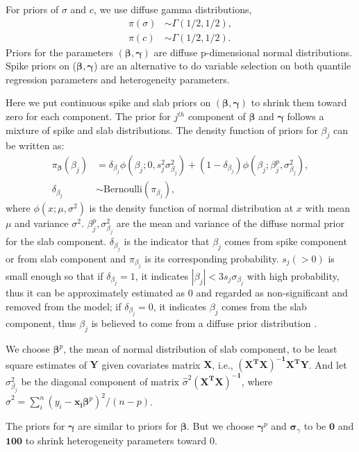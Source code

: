 \documentclass[12pt]{article}
\begin{document}
For priors of $\sigma$ and $c$, we use diffuse gamma distributions,
\begin{align*}
  \pi(\sigma) & \sim \Gamma (1/2, 1/2), \\
  \pi(c) & \sim \Gamma(1/2, 1/2).
\end{align*}
Priors for the parameters $(\bm{\beta}, \bm{\gamma})$ are diffuse
p-dimensional normal distributions.  Spike priors on ($\bm \beta,
\bm \gamma$) are an alternative to do variable selection on both
quantile regression parameters and heterogeneity parameters.

Here we put continuous spike and slab priors on $(\bm \beta, \bm
\gamma)$ to shrink them toward zero for each component. The prior for
$j^{th}$ component of $\bm \beta$ and $\bm \gamma$ follows a mixture
of spike and slab distributions.  The density function of priors for
$\beta_j$ can be written as:
\begin{align*}
  \pi_{\bm \beta} (\beta_j) &= \delta_{\beta_j} \phi(\beta_j; 0, s_j^2
  \sigma_{\beta_j}^2) +
  (1- \delta_{\beta_j}) \phi(\beta_j; \beta_j^p, \sigma_{\beta_j}^2),\\
  \delta_{\beta_j} & \sim \mbox{Bernoulli} (\pi_{\beta_j}),
\end{align*}
where $\phi(x; \mu, \sigma^2)$ is the density function of normal
distribution at $x$ with mean $\mu$ and variance
$\sigma^2$. $\beta_j^p, \sigma_{\beta_j}^2$ are the mean and variance
of the diffuse normal prior for the slab component.
$\delta_{\beta_j}$ is the indicator that $\beta_j$ comes from spike
component or from slab component and $\pi_{\beta_j}$ is its corresponding
probability.  $s_j (>0)$ is small enough so that if $\delta_{\beta_j}
= 1$, it indicates $|\beta_j | < 3 s_j\sigma_{\beta_j}$ with high
probability, thus it can be approximately estimated as 0 and regarded
as non-significant and removed from the model; if $\delta_{\beta_j} =
0$, it indicates $\beta_j$ comes from the slab component, thus
$\beta_j$ is believed to come from a diffuse prior distribution
\citep{george1993}.

We choose $\bm \beta^p$, the mean of normal distribution of slab
component, to be least square estimates of $\bm Y$ given covariates
matrix $\bm X$, i.e., $\bm{(X^TX)^{-1}X^TY}$. And let
$\sigma_{\beta_j}^2$ be the diagonal component of matrix
$\hat{\sigma}^2 \bm{(X^TX)^{-1}}$, where $\hat{\sigma}^2 = \sum_i^n
(y_i - \bm{x_i\beta}^p)^2/(n - p)$.

The priors for $\bm \gamma$ are similar to priors for $\bm \beta$. But
we choose $\bm \gamma^p$ and $\bm \sigma_{\gamma}$ to be $\bm 0$ and
$\bm{100}$ to shrink heterogeneity parameters toward 0.
\end{document}
